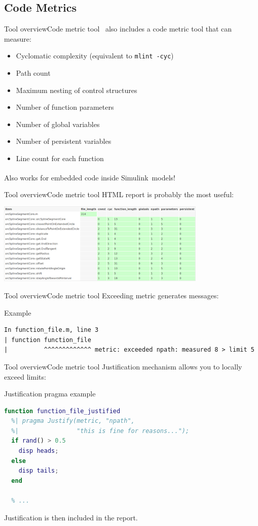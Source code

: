 \documentclass{beamer}
\newcommand{\mh}[0]{{\sc\structure{Miss\_Hit}}}
\newcommand{\simulink}[0]{Simulink\textsuperscript{\tiny\textregistered}}
\begin{document}
\subsection{Code Metrics}
\begin{frame}{Tool overview}{Code metric tool}
  \mh~also includes a code metric tool that can measure:
  \begin{itemize}
  \item Cyclomatic complexity (equivalent to {\tt mlint -cyc})
  \item Path count
  \item Maximum nesting of control structures
  \item Number of function parameters
  \item Number of global variables
  \item Number of persistent variables
  \item Line count for each function
  \end{itemize}
  \pause
  Also works for embedded code inside \simulink\ models!
\end{frame}

\begin{frame}{Tool overview}{Code metric tool}
  HTML report is probably the most useful:
  \begin{center}
    \includegraphics[width=10cm]{metrics.png}
  \end{center}
\end{frame}

\begin{frame}[fragile]{Tool overview}{Code metric tool}
  Exceeding metric generates messages:
  \begin{block}{Example}
    \scriptsize
\begin{verbatim}
In function_file.m, line 3
| function function_file
|          ^^^^^^^^^^^^^ metric: exceeded npath: measured 8 > limit 5
\end{verbatim}
  \end{block}
\end{frame}

\begin{frame}[fragile]{Tool overview}{Code metric tool}
  Justification mechanism allows you to locally exceed limits:
  \begin{block}{Justification pragma example}
\begin{lstlisting}[language=MATLAB]
function function_file_justified
  %| pragma Justify(metric, "npath",
  %|                "this is fine for reasons...");
  if rand() > 0.5
    disp heads;
  else
    disp tails;
  end

  % ...
\end{lstlisting}
  \end{block}
  \pause
  Justification is then included in the report.
\end{frame}
\end{document}
